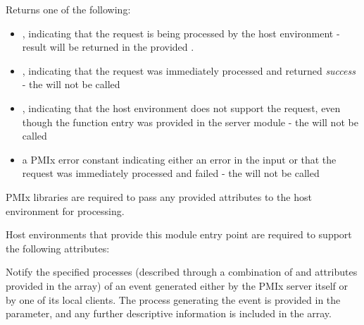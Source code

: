 \begin{arglist}
\end{arglist}

Returns one of the following:

\begin{itemize}
    \item {}, indicating that the request is being processed by the host environment - result will be returned in the provided .
    \item {}, indicating that the request was immediately processed and returned \textit{success} - the  will not be called
    \item {}, indicating that the host environment does not support the request, even though the function entry was provided in the server module - the  will not be called
    \item a PMIx error constant indicating either an error in the input or that the request was immediately processed and failed - the  will not be called
\end{itemize}

\reqattrstart
\ac{PMIx} libraries are required to pass any provided attributes to the host environment for processing.

Host environments that provide this module entry point are required to support the following attributes:


\reqattrend

\descr

Notify the specified processes (described through a combination of  and attributes provided in the  array) of an event generated either by the \ac{PMIx} server itself or by one of its local clients.
The process generating the event is provided in the  parameter, and any further descriptive information is
included in the  array.

